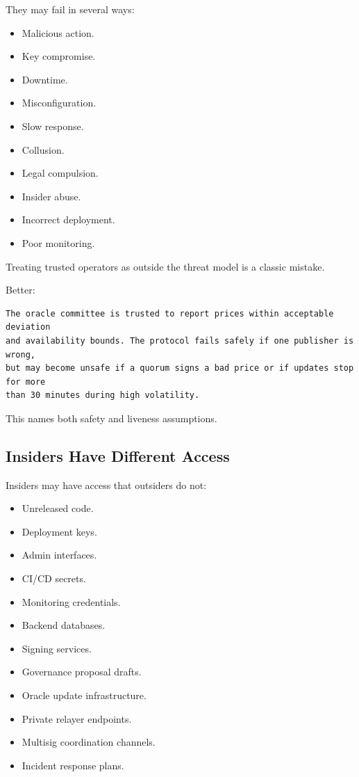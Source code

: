 They may fail in several ways:

\begin{itemize}
\tightlist
\item
  Malicious action.
\item
  Key compromise.
\item
  Downtime.
\item
  Misconfiguration.
\item
  Slow response.
\item
  Collusion.
\item
  Legal compulsion.
\item
  Insider abuse.
\item
  Incorrect deployment.
\item
  Poor monitoring.
\end{itemize}

Treating trusted operators as outside the threat model is a classic
mistake.

Better:

\begin{lstlisting}
The oracle committee is trusted to report prices within acceptable deviation
and availability bounds. The protocol fails safely if one publisher is wrong,
but may become unsafe if a quorum signs a bad price or if updates stop for more
than 30 minutes during high volatility.
\end{lstlisting}

This names both safety and liveness assumptions.

\subsection{Insiders Have Different Access}

Insiders may have access that outsiders do not:

\begin{itemize}
\tightlist
\item
  Unreleased code.
\item
  Deployment keys.
\item
  Admin interfaces.
\item
  CI/CD secrets.
\item
  Monitoring credentials.
\item
  Backend databases.
\item
  Signing services.
\item
  Governance proposal drafts.
\item
  Oracle update infrastructure.
\item
  Private relayer endpoints.
\item
  Multisig coordination channels.
\item
  Incident response plans.
\end{itemize}

